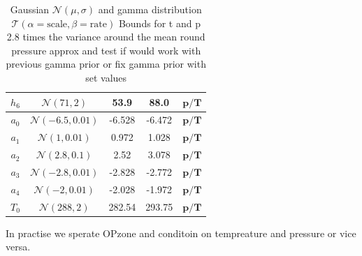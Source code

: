 \begin{table}
\begin{tabular}{ |c||c|c|c|c|   }
		$h_{6}$ &  $\mathcal{N}(71,2)$&53.9 &88.0&$\bm{p/T}$\\ \hline
		$a_{0}$ &  $\mathcal{N}(-6.5,0.01)$&-6.528 &-6.472&$\bm{p/T}$\\ \hline
		$a_{1}$ &  $\mathcal{N}(1,0.01)$&0.972 &1.028&$\bm{p/T}$\\ \hline
		$a_{2}$ &  $\mathcal{N}(2.8,0.1)$&2.52 &3.078&$\bm{p/T}$\\ \hline
		$a_{3}$ &  $\mathcal{N}(-2.8,0.01)$&-2.828 &-2.772&$\bm{p/T}$\\ \hline
		$a_{4}$ & $\mathcal{N}(-2,0.01)$ &-2.028 &-1.972&$\bm{p/T}$\\ \hline
		$T_{0}$ &  $\mathcal{N}(288,2)$& 282.54 &293.75&$\bm{p/T}$\\
		\hline
	\end{tabular}
	\caption{Gaussian $\mathcal{N}(\mu,\sigma)$ and gamma distribution $\mathcal{T}(\alpha = \text{scale}, \beta = \text{rate})$
		Bounds for t and p 2.8 times the variance around the mean
		round pressure approx and  test if would work with previous gamma prior or fix gamma prior with set values}
	\label{tab:1}
\end{table}

In practise we sperate OPzone and conditoin on tempreature and pressure  or vice versa. 
